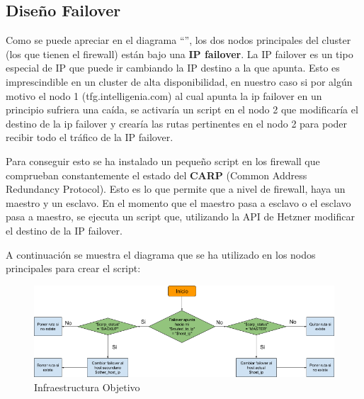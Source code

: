 \subsection{Diseño Failover}
\begin{text}
	Como se puede apreciar en el diagrama ``'', los dos nodos principales del cluster (los que tienen el firewall) están bajo una \textbf{IP failover}. La IP failover es un tipo especial de IP que puede ir cambiando la IP destino a la que apunta. Esto es imprescindible en un cluster de alta disponibilidad, en nuestro caso si por algún motivo el nodo 1 (tfg.intelligenia.com) al cual apunta la ip failover en un principio sufriera una caída, se activaría un script en el nodo 2 que modificaría el destino de la ip failover y crearía las rutas pertinentes en el nodo 2 para poder recibir todo el tráfico de la IP failover.
	
	Para conseguir esto se ha instalado un pequeño script en los firewall que comprueban constantemente el estado del \textbf{CARP} (Common Address Redundancy Protocol). Esto es lo que permite que a nivel de firewall, haya un maestro y un esclavo. En el momento que el maestro pasa a esclavo o el esclavo pasa a maestro, se ejecuta un script que, utilizando la API de Hetzner modificar el destino de la IP failover.
	
	A continuación se muestra el diagrama que se ha utilizado en los nodos principales para crear el script:
	
	\begin{figure}[!hbt]
		\label{script_failover}
		\centering
		\includegraphics[scale=0.45]{imagenes/Diseno/diagramascript.png}
		\caption[Infraestructura Objetivo]{Infraestructura Objetivo}
	\end{figure}
\end{text}
\clearpage

